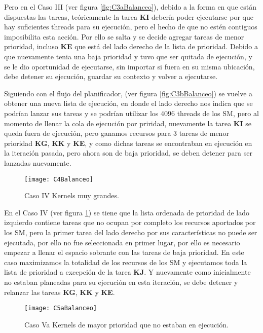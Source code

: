    Pero en el Caso III (ver figura \ref{fig:C3aBalanceo}), debido a la forma en que están dispuestas las tareas, teóricamente la tarea \textbf{KI} debería poder ejecutarse por que hay suficientes threads para su ejecución, pero el hecho de que no estén contiguos imposibilita esta acción. Por ello se salta y se decide agregar tareas de menor prioridad, incluso \textbf{KE} que está del lado derecho de la lista de prioridad. Debido a que nuevamente tenia una baja prioridad y tuvo que ser quitada de ejecución, y se le dio oportunidad de ejecutarse, sin importar si fuera en su misma ubicación, debe detener su ejecución, guardar su contexto y volver a ejecutarse.
\newline

    Siguiendo con el flujo del planificador, (ver figura \ref{fig:C3bBalanceo}) se vuelve a obtener una nueva lista de ejecución, en donde el lado derecho nos indica que se podrían lanzar sus tareas y se podrían utilizar los 4096 threads de los SM, pero al momento de llenar la cola de ejecución por priridad, nuevamente la tarea \textbf{KI} se queda fuera de ejecución, pero ganamos recursos para 3 tareas de menor prioridad \textbf{KG}, \textbf{KK} y \textbf{KE}, y como dichas tareas se encontraban en ejecución en la iteración pasada, pero ahora son de baja prioridad, se deben detener para ser lanzadas nuevamente.
\newline

    \begin{figure}[ht]
      \centering
        \texttt{[image: C4Balanceo]}
        \caption{Caso IV Kernels muy grandes.}
        \label{fig:C4Balanceo}
    \end{figure}
    En el Caso IV (ver figura \ref{fig:C4Balanceo}) se tiene que la lista ordenada de prioridad de lado izquierdo contiene tareas que no ocupan por completo los recursos aportados por los SM, pero la primer tarea del lado derecho por sus características no puede ser ejecutada, por ello no fue seleccionada en primer lugar, por ello es necesario empezar a llenar el espacio sobrante con las tareas de baja prioridad. En este caso maximizamos la totalidad de los recursos de los SM y ejecutamos toda la lista de prioridad a excepción de la tarea \textbf{KJ}. Y nuevamente como inicialmente no estaban planeadas para su ejecución en esta iteración, se debe detener y relanzar las tareas \textbf{KG}, \textbf{KK} y \textbf{KE}.
\newline

    \begin{figure}[]
      \centering
        \texttt{[image: C5aBalanceo]}
        \caption{Caso Va Kernels de mayor prioridad que no estaban en ejecución.}
        \label{fig:C5aBalanceo}
    \end{figure}
    
